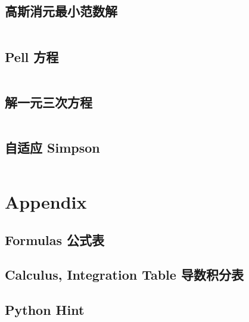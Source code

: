 \documentclass[titlepage, a4paper]{article}
\begin{document}
\begin{multicols}{2}
\begin{spacing}{0.6}
				\subsection{高斯消元最小范数解}
					\inputminted{cpp}{src/Geometry/minnorm_gauss.cpp}
				\subsection{Pell 方程}
					\inputminted{cpp}{src/Math/Pell方程.cpp}
				\subsection{解一元三次方程}
					\inputminted{cpp}{src/Math/解一元三次方程.cpp}
				\subsection{自适应 Simpson}
					\inputminted{cpp}{src/Math/Simpson.cpp}
		
			
			\section{Appendix}
				\begin{spacing}{0.4}
				\subsection{Formulas 公式表}
					
				\subsection{Calculus, Integration Table 导数积分表}
					
					
				\subsection{Python Hint}
					\inputminted{python}{src/Miscellany/py.py}
				\end{spacing}


\end{spacing}
\end{multicols}
\end{document}
